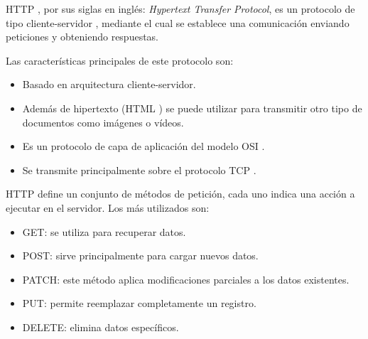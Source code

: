 HTTP \citep{WEBSITE:HTTP}, por sus siglas en inglés: \textit{Hypertext Transfer Protocol}, es un protocolo de tipo cliente-servidor \citep{WEBSITE:CLIENTESERVIDOR}, mediante el cual se establece una comunicación enviando peticiones y obteniendo respuestas. 

Las características principales de este protocolo son:
\begin{itemize}
	\item Basado en arquitectura cliente-servidor.
	\item Además de hipertexto (HTML \citep{WEBSITE:HTML}) se puede utilizar para transmitir otro tipo de documentos como imágenes o vídeos.
	\item Es un protocolo de capa de aplicación del modelo OSI \citep{WEBSITE:OSI}.
	\item Se transmite principalmente sobre el protocolo TCP \citep{WEBSITE:TCP}.	
\end{itemize}

HTTP define un conjunto de métodos de petición, cada uno indica una acción a ejecutar en el servidor. Los más utilizados son:
\begin{itemize}
	\item GET: se utiliza para recuperar datos.
	\item POST: sirve principalmente para cargar nuevos datos.
	\item PATCH: este método aplica modificaciones parciales a los datos existentes.
	\item PUT: permite reemplazar completamente un registro.
	\item DELETE: elimina datos específicos.	
\end{itemize}


%
%
%
%
%
%

